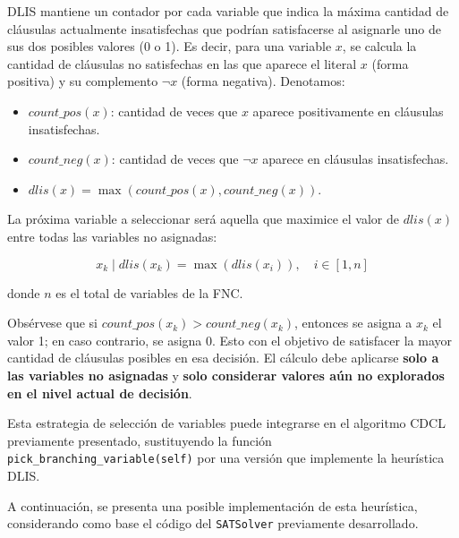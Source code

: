 DLIS mantiene un contador por cada variable que indica la m\'axima cantidad de cl\'ausulas actualmente insatisfechas que podr\'ian satisfacerse al asignarle uno de sus dos posibles valores (0 o 1). Es decir, para una variable $x$, se calcula la cantidad de cl\'ausulas no satisfechas en las que aparece el literal $x$ (forma positiva) y su complemento $\neg x$ (forma negativa). Denotamos:

\begin{itemize}
  \item $\textit{count\_pos}(x)$: cantidad de veces que $x$ aparece positivamente en cl\'ausulas insatisfechas.
  \item $\textit{count\_neg}(x)$: cantidad de veces que $\neg x$ aparece en cl\'ausulas insatisfechas.
  \item $\textit{dlis}(x) = \max(\textit{count\_pos}(x), \textit{count\_neg}(x))$.
\end{itemize}

La pr\'oxima variable a seleccionar ser\'a aquella que maximice el valor de $\textit{dlis}(x)$ entre todas las variables no asignadas:

\begin{equation*}
  x_k \mid \textit{dlis}(x_k) = \max(\textit{dlis}(x_i)),\quad i \in [1,n]
\end{equation*}

donde $n$ es el total de variables de la FNC.

Obs\'ervese que si $\textit{count\_pos}(x_k) > \textit{count\_neg}(x_k)$, entonces se asigna a $x_k$ el valor 1; en caso contrario, se asigna 0. Esto con el objetivo de satisfacer la mayor cantidad de cl\'ausulas posibles en esa decisi\'on. El c\'alculo debe aplicarse \textbf{solo a las variables no asignadas} y \textbf{solo considerar valores a\'{u}n no explorados en el nivel actual de decisi\'on}.

Esta estrategia de selecci\'on de variables puede integrarse en el algoritmo CDCL previamente presentado, sustituyendo la funci\'on \texttt{pick\_branching\_variable(self)} por una versi\'on que implemente la heur\'istica DLIS.

A continuaci\'on, se presenta una posible implementaci\'on de esta heur\'istica, considerando como base el c\'odigo del \texttt{SATSolver} previamente desarrollado.

